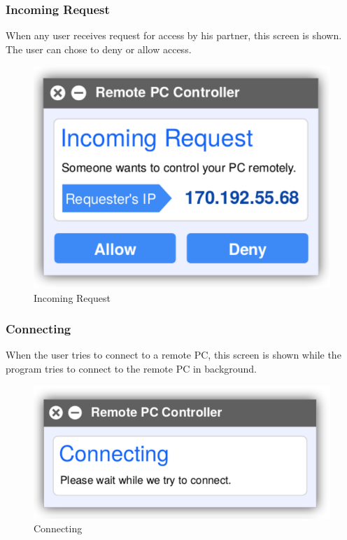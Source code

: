 \documentclass[12pt, a4paper]{article}
\begin{document}
\subsubsection{Incoming Request}
When any user receives request for access by his partner, this screen is shown. The user can chose to deny or allow access.

\begin{figure}[h!]
\centering
\includegraphics[scale=0.75]{incoming}
\caption{Incoming Request}
\end{figure}

\subsubsection{Connecting}
When the user tries to connect to a remote PC, this screen is shown while the program tries to connect to the remote PC in background.

\begin{figure}[h!]
\centering
\includegraphics[scale=0.75]{connecting}
\caption{Connecting}
\end{figure}
\end{document}
